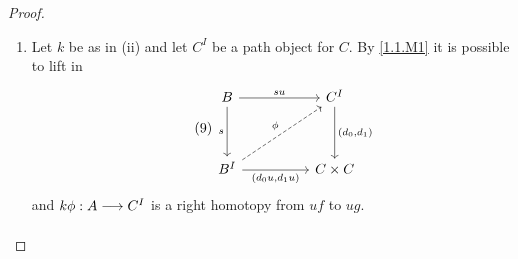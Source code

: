 \documentclass[../main]{subfiles}
\begin{document}
\begin{proof}
\begin{enumerate}[label = (\roman*)]
	\item Let $k$ be as in (ii) and let $C^I$ be a path object for $C$. By \ref{1.1.M1} it is possible to lift in
    \[\tag{9}\label{diag:1.1.9}\begin{tikzcd}
	B && {C^I} \\
	\\
	{B^I} && {C\times C}
	\arrow["s"', from=1-1, to=3-1]
	\arrow["su", from=1-1, to=1-3]
	\arrow["{(d_0u,d_1u)}"', from=3-1, to=3-3]
	\arrow["{(d_0,d_1)}", from=1-3, to=3-3]
	\arrow["\phi", dashed, from=3-1, to=1-3]
    \end{tikzcd}\]
		and $k\phi:A\varrightarrow{}C^I$ is a right homotopy from $uf$ to $ug$.
	\end{enumerate}
\end{proof}
\end{document}
